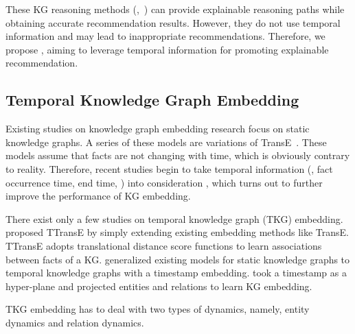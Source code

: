 These KG reasoning methods (\eg,~\cite{pgpr, ADAC, RLconversa}) can provide explainable reasoning paths while obtaining accurate recommendation results.
However, they do not use temporal information and may lead to inappropriate
recommendations.
Therefore, we propose \tkgrec, aiming to leverage temporal information for promoting explainable recommendation.



\subsection{Temporal Knowledge Graph Embedding}


Existing studies on knowledge graph embedding research focus on static
knowledge graphs. A series of these models are variations of 
TransE~\cite{transE, transD,
transH, transR}. These models assume that facts are not changing with time, which is
obviously contrary to reality. 
%
Therefore, recent studies begin to take temporal information (\eg , fact
occurrence time, end time, \etc)
%
%
into consideration \cite{surveyKG}, which turns out to further improve the
performance of KG embedding.

There exist only a few studies on temporal knowledge graph (TKG) embedding. 
%
\cite{leblay} proposed TTransE by simply extending existing
embedding methods like TransE. TTransE adopts translational distance score
functions to learn associations between facts of a KG.
%
\cite{ma_embedding} generalized existing models for static
knowledge graphs to temporal knowledge graphs with a timestamp embedding. 
%
\cite{hyte} took a timestamp as a hyper-plane and projected
entities and relations to learn KG embedding. 

TKG embedding has to deal with two types of dynamics, namely,
entity dynamics and relation dynamics.

